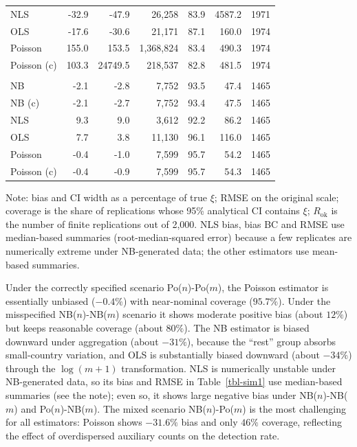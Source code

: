 \begin{table}[ht!]
\begin{tabular*}{\linewidth}{@{\extracolsep{\fill}}lrrrrrr}
NLS & -32.9 & -47.9 & 26,258 & 83.9 & 4587.2 & 1971 \\ 
OLS & -17.6 & -30.6 & 21,171 & 87.1 & 160.0 & 1974 \\ 
Poisson & 155.0 & 153.5 & 1,368,824 & 83.4 & 490.3 & 1974 \\ 
Poisson (c) & 103.3 & 24749.5 & 218,537 & 82.8 & 481.5 & 1974 \\ 
\midrule\addlinespace[2.5pt]
\multicolumn{7}{l}{Po($n$)-Po($m$)} \\[2.5pt] 
\midrule\addlinespace[2.5pt]
NB & -2.1 & -2.8 & 7,752 & 93.5 & 47.4 & 1465 \\ 
NB (c) & -2.1 & -2.7 & 7,752 & 93.4 & 47.5 & 1465 \\ 
NLS & 9.3 & 9.0 & 3,612 & 92.2 & 86.2 & 1465 \\ 
OLS & 7.7 & 3.8 & 11,130 & 96.1 & 116.0 & 1465 \\ 
Poisson & -0.4 & -1.0 & 7,599 & 95.7 & 54.2 & 1465 \\ 
Poisson (c) & -0.4 & -0.9 & 7,599 & 95.7 & 54.3 & 1465 \\ 
\bottomrule
\end{tabular*}
\begin{minipage}{\linewidth}
\vspace{.05em}
Note: bias and CI width as a percentage of true $\xi$; RMSE on the original scale; coverage is the share of replications whose 95\% analytical CI contains $\xi$; $R_{\text{ok}}$ is the number of finite replications out of 2,000. NLS bias, bias BC and RMSE use median-based summaries (root-median-squared error) because a few replicates are numerically extreme under NB-generated data; the other estimators use mean-based summaries.\\
\end{minipage}
\end{table}


Under the correctly specified scenario Po($n$)-Po($m$), the Poisson estimator
is essentially unbiased ($-0.4\%$) with near-nominal coverage ($95.7\%$).
Under the misspecified NB($n$)-NB($m$) scenario it shows moderate positive
bias (about $12\%$) but keeps reasonable coverage (about $80\%$). The NB
estimator is biased downward under aggregation (about $-31\%$), because
the ``rest'' group absorbs small-country variation, and OLS is
substantially biased downward (about $-34\%$) through the $\log(m+1)$
transformation. NLS is numerically unstable under NB-generated data, so
its bias and RMSE in Table~\ref{tbl-sim1} use median-based summaries (see
the note); even so, it shows large negative bias under NB($n$)-NB($m$) and
Po($n$)-NB($m$). The mixed scenario NB($n$)-Po($m$) is the most challenging for
all estimators: Poisson shows $-31.6\%$ bias and only $46\%$ coverage,
reflecting the effect of overdispersed auxiliary counts on the detection
rate.

